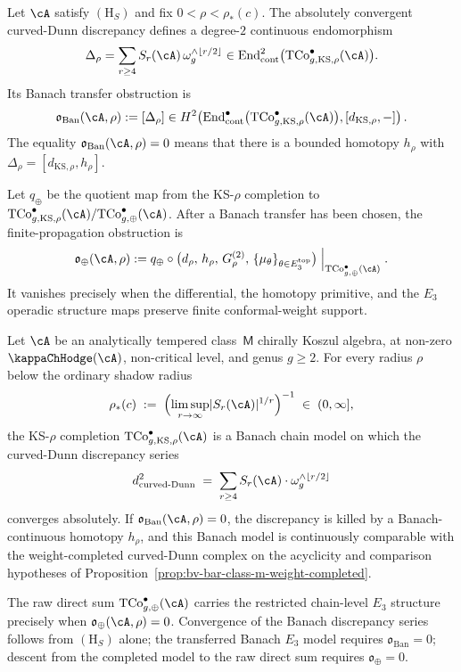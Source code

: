 \begin{definition}
\label{def:banach-transfer-finite-propagation-obstruction}
Let $\cA$ satisfy $(\mathrm{H}_S)$ and fix
$0<\rho<\rho_*(c)$. The absolutely convergent curved-Dunn discrepancy
defines a degree-$2$ continuous endomorphism
\[
 \Delta_\rho
 =
 \sum_{r\ge4}S_r(\cA)\,
 \omega_g^{\wedge\lfloor r/2\rfloor}
 \in
 \operatorname{End}^2_{\mathrm{cont}}
 \bigl(\mathrm{TCo}^{\bullet}_{g,\mathrm{KS},\rho}(\cA)\bigr).
\]
Its Banach transfer obstruction is
\[
 \mathfrak{o}_{\mathrm{Ban}}(\cA,\rho)
 :=
 [\Delta_\rho]
 \in
 H^2\!\left(
 \operatorname{End}^{\bullet}_{\mathrm{cont}}
 \bigl(\mathrm{TCo}^{\bullet}_{g,\mathrm{KS},\rho}(\cA)\bigr),
 [d_{\mathrm{KS},\rho},-]\right).
\]
The equality
$\mathfrak{o}_{\mathrm{Ban}}(\cA,\rho)=0$ means that there is a
bounded homotopy $h_\rho$ with
$\Delta_\rho=[d_{\mathrm{KS},\rho},h_\rho]$.

Let $q_\oplus$ be the quotient map from the KS-$\rho$ completion to
$\mathrm{TCo}^{\bullet}_{g,\mathrm{KS},\rho}(\cA)/
\mathrm{TCo}^{\bullet}_{g,\oplus}(\cA)$. After a Banach transfer has
been chosen, the finite-propagation obstruction is
\[
 \mathfrak{o}_{\oplus}(\cA,\rho)
 :=
 q_\oplus \circ
 \bigl(d_{\rho},\,h_\rho,\,G^{(2)}_{\rho},\,
 \{\mu_\theta\}_{\theta\in E_3^{\mathrm{top}}}\bigr)
 \Bigm|_{\mathrm{TCo}^{\bullet}_{g,\oplus}(\cA)} .
\]
It vanishes precisely when the differential, the homotopy primitive,
and the $E_3$ operadic structure maps preserve finite
conformal-weight support.
\end{definition}

\begin{theorem}
\label{thm:chain-level-e3-original-complex-conditional}
Let $\cA$ be an analytically tempered class~$\mathsf{M}$ chirally
Koszul algebra, at non-zero $\kappaChHodge(\cA)$, non-critical level, and
genus $g \ge 2$. For every radius $\rho$ below the ordinary shadow
radius
\[
 \rho_*(c)
 \;:=\;
 \Bigl( \limsup_{r \to \infty}
 \lvert S_r(\cA) \rvert^{1/r} \Bigr)^{-1}
 \;\in\;
 (0, \infty],
\]
the KS-$\rho$ completion
$\mathrm{TCo}^{\bullet}_{g,\mathrm{KS},\rho}(\cA)$ is a Banach
chain model on which the curved-Dunn discrepancy series
\[
 d^2_{\mathrm{curved\text{-}Dunn}}
 \;=\;
 \sum_{r \ge 4} S_r(\cA) \cdot \omega_g^{\wedge \lfloor r/2 \rfloor}
\]
converges absolutely. If
$\mathfrak{o}_{\mathrm{Ban}}(\cA,\rho)=0$, the discrepancy is killed
by a Banach-continuous homotopy $h_\rho$, and this Banach model is
continuously comparable with the weight-completed curved-Dunn complex
on the acyclicity and comparison hypotheses of
Proposition~\ref{prop:bv-bar-class-m-weight-completed}.

The raw direct sum
$\mathrm{TCo}^{\bullet}_{g,\oplus}(\cA)$ carries the restricted
chain-level $E_3$ structure precisely when
$\mathfrak{o}_{\oplus}(\cA,\rho)=0$. Convergence of the Banach
discrepancy series follows from $(\mathrm{H}_S)$ alone; the transferred
Banach $E_3$ model requires $\mathfrak{o}_{\mathrm{Ban}}=0$; descent
from the completed model to the raw direct sum requires
$\mathfrak{o}_{\oplus}=0$.
\end{theorem}

